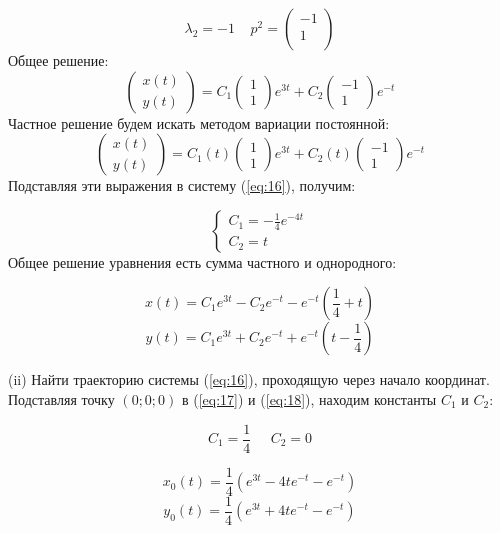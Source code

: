 \documentclass[a4paper, 12pt]{article}
\begin{document}
\[\lambda_2=-1\;\;\;\; p^2=
\left(
\begin{array}{cc}
-1\\
1\\
\end{array}
\right) 
\]
Общее решение:
\[\left(
\begin{array}{c}
x(t)\\
y(t)
\end{array}
\right)=C_1\left(
\begin{array}{c}
1 \\
1
\end{array}
\right)e^{3t}+C_2\left(
\begin{array}{c}
-1 \\
1
\end{array}
\right)e^{-t}\]
Частное решение будем искать методом вариации постоянной:
\[\left(
\begin{array}{c}
x(t)\\
y(t)
\end{array}
\right)=C_1(t)\left(
\begin{array}{c}
1 \\
1
\end{array}
\right)e^{3t}+C_2(t)\left(
\begin{array}{c}
-1 \\
1
\end{array}
\right)e^{-t}\]
Подставляя эти выражения в систему (\ref{eq:16}), получим:

\[
\left\{
\begin{array}{lr}
C_1  = - \frac 1 4 e^{-4t}\\
C_2 = t
\end{array}
\right.
\]
Общее решение уравнения есть сумма частного и однородного:

\begin{equation}
x(t) = C_1e^{3t}-C_2e^{-t}-e^{-t}\left(\frac 1 4 + t\right)
\label{eq:17}
\end{equation}
\begin{equation}
y(t) = C_1e^{3t}+C_2e^{-t}+e^{-t}\left(t-\frac 1 4 \right)
\label{eq:18}
\end{equation}

(ii) Найти траекторию системы (\ref{eq:16}), проходящую через начало координат.\\
Подставляя точку $(0;0;0)$ в (\ref{eq:17}) и (\ref{eq:18}), находим константы $C_1$ и $C_2$:

\[C_1 = \frac 1 4 \;\;\;\;\; C_2 =0\]

\[
x_0(t) =\frac 1 4\left(e^{3t} -4te^{-t}-e^{-t}\right)\]
\[
y_0(t) = \frac 1 4\left(e^{3t} +4te^{-t}-e^{-t}\right)
\]
\end{document}
